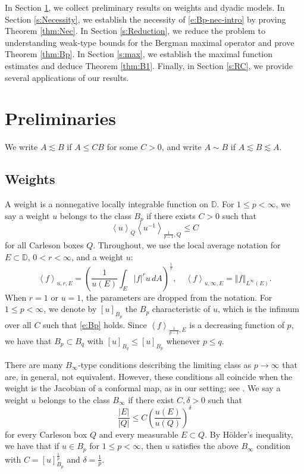 \documentclass{amsart}
\newcommand{\norm}[1]{\left\Vert {#1}\right\Vert}
\newcommand{\avg}[1]{\left\langle {#1}\right\rangle}
\theoremstyle{definition}
\numberwithin{equation}{section}
\begin{document}
In Section \ref{s:Preliminaries}, we collect preliminary results on weights and dyadic models. In Section \ref{s:Necessity}, we establish the necessity of \eqref{e:Bp-nec-intro} by proving Theorem \ref{thm:Nec}. In Section \ref{s:Reduction}, we reduce the problem to understanding weak-type bounds for the Bergman maximal operator and prove Theorem \ref{thm:Bp}. In Section \ref{s:max}, we establish the maximal function estimates and deduce Theorem \ref{thm:B1}. Finally, in Section \ref{s:RC}, we provide several applications of our results.

\section{Preliminaries}\label{s:Preliminaries}

We write $A\lesssim B$ if $A\leq CB$ for some $C>0$, and write $A\sim B$ if $A\lesssim  B\lesssim A$. 
\subsection{Weights} 
A weight is a nonnegative locally integrable function on $\mathbb D$. For $1 \le p < \infty$, we say a weight $u$ belongs to the class $B_p$ if there exists $C>0$ such that 
 	\begin{equation}\label{e:Bp} \avg{u}_Q \avg{u^{-1}}_{\frac{1}{p-1},Q} \le C \end{equation}
 for all Carleson boxes $Q$. Throughout, we use the local average notation for $E \subset \mathbb D$, $0 < r < \infty$, and a weight $u$:
 	\[ \avg{f}_{u,r,E} = \left(\frac{1}{u(E)} \int_E |f|^r u \, dA \right)^{\frac 1r}, \quad \avg{f}_{u,\infty,E} = \norm{f}_{L^\infty(E)}. \]
When $r=1$ or $u=1$, the parameters are dropped from the notation. For $1 \le p < \infty$, we denote by $[u]_{B_p}$ the $B_p$ characteristic of $u$, which is the infimum over all $C$ such that \eqref{e:Bp} holds. Since $\avg{f}_{\frac{1}{p-1},E}$ is a decreasing function of $p$, we have that $B_p \subset B_q$ with $[u]_{B_q} \le [u]_{B_p}$ whenever $p \leq q$. 


There are many $B_\infty$-type conditions describing the limiting class as $p \rightarrow \infty$ that are, in general, not equivalent. However, these conditions all coincide when the weight is the Jacobian of a conformal map, as in our setting; see \cite{APR19}. We say a weight $u$ belongs to the class $B_\infty$ if there exist $C,\delta>0$ such that 
\begin{equation}\label{e:Binfty} 
    \frac{|E|}{|Q|} \le C \left( \frac{u(E)}{u(Q)} \right)^{\delta}
\end{equation}
for every Carleson box $Q$ and every measurable $E \subset Q$. By H\"older's inequality, we have that if $u\in B_p$ for $1\le p < \infty$, then $u$ satisfies the above $B_{\infty}$ condition with $C = [u]_{B_p}^{\frac{1}{p}}$ and $\delta= \frac{1}{p}$. 
\end{document}
